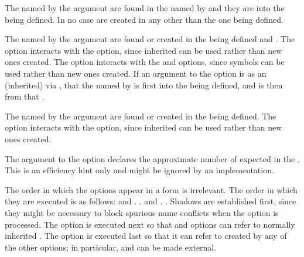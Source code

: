 
The  named by the argument 
are found in the  named by  and 
they are  into the  being defined.
In no case are  created in any 
other than the one being defined.
 

The  named by
the argument   are found 
or created in the  being defined
and .
The  option interacts
with the  option, since inherited  
        can be used rather than new ones created.
The  option interacts
        with the 
 and  options, since 
symbols can be used rather than new ones created.
If an argument to the  option is  as
an (inherited)  via , that the
 named by 
is first  into the  being
defined, and is then  from that .
 

The  named by the argument  
are found or created in the  being defined.
The  option interacts with the 
 option, since inherited  
can be used rather than new ones created.  


The argument to the  option
declares the approximate number of  expected in the 
.
        This is an efficiency hint only and might be ignored by an
implementation.
\endlist
 
The order in which the options appear in a 
 form is irrelevant.
The order in which they are executed is as follows:
\beginlist
{}
 and .
. 
 and .
.
\endlist
Shadows are established first, since they might  be necessary to block 
spurious name conflicts when the  
option is processed. The  option is executed
next so that  and  options can refer to normally 
inherited .  
The  option is executed last so that it can refer to 
 created by any of the other options; in 
particular,  and 
  can be made external.  
 
